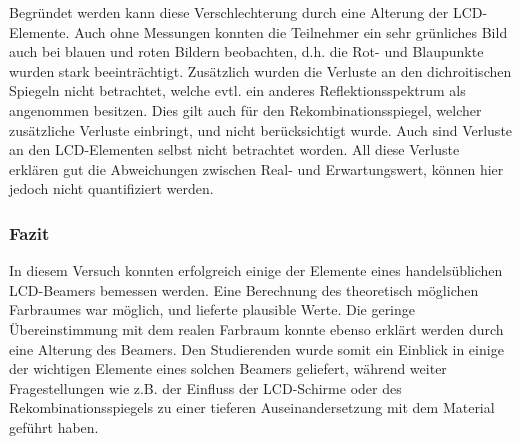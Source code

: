 Begründet werden kann diese Verschlechterung durch eine Alterung der LCD-Elemente. Auch ohne Messungen konnten die Teilnehmer ein sehr grünliches Bild auch bei blauen und roten Bildern beobachten, d.h. die Rot- und Blaupunkte wurden stark beeinträchtigt. Zusätzlich wurden die Verluste an den dichroitischen Spiegeln nicht betrachtet, welche evtl. ein anderes Reflektionsspektrum als angenommen besitzen. Dies gilt auch für den Rekombinationsspiegel, welcher zusätzliche Verluste einbringt, und nicht berücksichtigt wurde. Auch sind Verluste an den LCD-Elementen selbst nicht betrachtet worden. All diese Verluste erklären gut die Abweichungen zwischen Real- und Erwartungswert, können hier jedoch nicht quantifiziert werden.

\subsubsection{Fazit}

In diesem Versuch konnten erfolgreich einige der Elemente eines handelsüblichen LCD-Beamers bemessen werden. Eine Berechnung des theoretisch möglichen Farbraumes war möglich, und lieferte plausible Werte. Die geringe Übereinstimmung mit dem realen Farbraum konnte ebenso erklärt werden durch eine Alterung des Beamers. Den Studierenden wurde somit ein Einblick in einige der wichtigen Elemente eines solchen Beamers geliefert, während weiter Fragestellungen wie z.B. der Einfluss der LCD-Schirme oder des Rekombinationsspiegels zu einer tieferen Auseinandersetzung mit dem Material geführt haben.